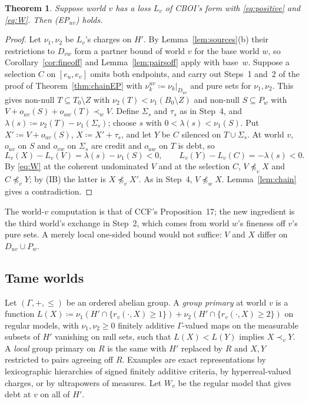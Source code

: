 \documentclass[11pt]{article}
\newtheorem{theorem}{Theorem}
\theoremstyle{definition}\newtheorem{definition}[theorem]{Definition}
\theoremstyle{remark}\newtheorem{remark}[theorem]{Remark}
\begin{document}
\begin{theorem}\label{thm:chainW}
Suppose world $v$ has a loss $L_v$ of CBOI's form with \eqref{eq:positive}
and \eqref{eq:W}. Then (EP$_{uv}$) holds.
\end{theorem}
\begin{proof}
Let $\nu_1,\nu_2$ be $L_v$'s charges on $H'$. By Lemma~\ref{lem:sources}(b)
their restrictions to $D_{vw}$ form a partner bound of world $v$ for the base
world $w$, so Corollary~\ref{cor:fineoff} and Lemma~\ref{lem:pairsoff} apply
with base~$w$. Suppose a selection $C$ on $[e_u,e_v]$ omits both endpoints,
and carry out Steps~1 and~2 of the proof of Theorem~\ref{thm:chainEP} with
$\nu^{uv}_k\coloneqq\nu_k|_{D_{uv}}$ and pure sets for $\nu_1,\nu_2$. This gives
non-null $T\subseteq T_0\setminus Z$ with $\nu_2(T)<\nu_1(B_0\setminus Z)$ and
non-null $S\subseteq P_w$ with $V+o_{uv}(S)+o_{uw}(T)\prec_wV$. Define
$\Sigma_s$ and $\tau_s$ as in Step~4, and $\lambda(s)\coloneqq\nu_2(T)
-\nu_1(\Sigma_s)$; choose $s$ with $0<\lambda(s)<\nu_1(S)$. Put
$X'\coloneqq V+o_{uv}(S)$, $X\coloneqq X'+\tau_s$, and let $Y$ be $C$
silenced on $T\cup\Sigma_s$. At world $v$, $o_{uv}$ on $S$ and $o_{vw}$ on
$\Sigma_s$ are credit and $o_{uw}$ on $T$ is debt, so
\[
 L_v(X)-L_v(V)=\lambda(s)-\nu_1(S)<0,\qquad L_v(Y)-L_v(C)=-\lambda(s)<0.
\]
By \eqref{eq:W} at the coherent undominated $V$ and at the selection $C$,
$V\not\preceq_vX$ and $C\not\preceq_vY$; by (IB) the latter is
$X\not\preceq_vX'$. As in Step~4, $V\not\preceq_wX$. Lemma~\ref{lem:chain}
gives a contradiction.
\end{proof}

The world-$v$ computation is that of CCF's Proposition~17; the new
ingredient is the third world's exchange in Step~2, which comes from world
$w$'s fineness off $v$'s pure sets. A merely local one-sided bound would not
suffice: $V$ and $X$ differ on $D_{uv}\cup P_w$.

\subsection{Tame worlds}

Let $(\Gamma,+,\le)$ be an ordered abelian group. A \emph{group primary} at
world $v$ is a function $L(X)\coloneqq\nu_1(H'\cap\{r_v(\cdot,X)\ge1\})+
\nu_2(H'\cap\{r_v(\cdot,X)\ge2\})$ on regular models, with
$\nu_1,\nu_2\ge0$ finitely additive $\Gamma$-valued maps on the measurable
subsets of $H'$ vanishing on null sets, such that $L(X)<L(Y)$ implies
$X\prec_vY$. A \emph{local} group primary on $R$ is the same with $H'$
replaced by $R$ and $X,Y$ restricted to pairs agreeing off $R$. Examples are
exact representations by lexicographic hierarchies of signed finitely
additive criteria, by hyperreal-valued charges, or by ultrapowers of
measures. Let $W_v$ be the regular model that gives debt at $v$ on all of
$H'$.
\end{document}
